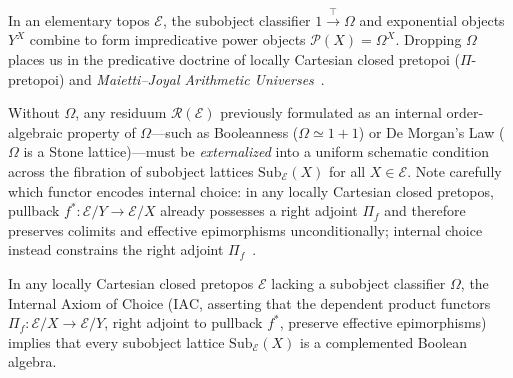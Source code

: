 In an elementary topos $\mathcal{E}$, the subobject classifier $1 \xrightarrow{\top} \Omega$ and exponential objects $Y^X$ combine to form impredicative power objects $\mathcal{P}(X) = \Omega^X$. Dropping $\Omega$ places us in the predicative doctrine of locally Cartesian closed pretopoi ($\Pi$-pretopoi) and \emph{Maietti--Joyal Arithmetic Universes}~\cite{Maietti05}.

Without $\Omega$, any residuum $\mathcal{R}(\mathcal{E})$ previously formulated as an internal order-algebraic property of $\Omega$---such as Booleanness ($\Omega \simeq 1+1$) or De Morgan's Law ($\Omega$ is a Stone lattice)---must be \emph{externalized} into a uniform schematic condition across the fibration of subobject lattices $\mathrm{Sub}_{\mathcal{E}}(X)$ for all $X \in \mathcal{E}$. Note carefully which functor encodes internal choice: in any locally Cartesian closed pretopos, pullback $f^* : \mathcal{E}/Y \to \mathcal{E}/X$ already possesses a right adjoint $\Pi_f$ and therefore preserves colimits and effective epimorphisms unconditionally; internal choice instead constrains the right adjoint $\Pi_f$~\cite{Diaconescu75,Johnstone02}.

\begin{proposition}\label{prop:predicative-diaconescu}%
%

In any locally Cartesian closed pretopos $\mathcal{E}$ lacking a subobject classifier $\Omega$, the Internal Axiom of Choice ($\mathrm{IAC}$, asserting that the dependent product functors $\Pi_f : \mathcal{E}/X \to \mathcal{E}/Y$, right adjoint to pullback $f^*$, preserve effective epimorphisms) implies that every subobject lattice $\mathrm{Sub}_{\mathcal{E}}(X)$ is a complemented Boolean algebra.

\end{proposition}

